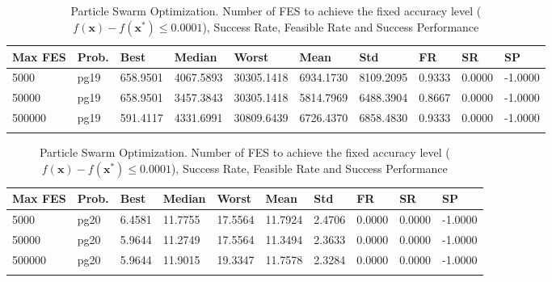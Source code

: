 \documentclass[10pt, a4paper]{book}
\begin{document}
\begin{center}
\begin{longtable}{l l l l l l l l l l}
\textbf{Max FES} & \textbf{Prob.} & \textbf{Best} & \textbf{Median} & \textbf{Worst} & \textbf{Mean} & \textbf{Std} & \textbf{FR} & \textbf{SR} & \textbf{SP} \\
\hline
5000 & pg19 & 658.9501 & 4067.5893 & 30305.1418 & 6934.1730 & 8109.2095 & 0.9333 & 0.0000 & -1.0000 \\
50000 & pg19 & 658.9501 & 3457.3843 & 30305.1418 & 5814.7969 & 6488.3904 & 0.8667 & 0.0000 & -1.0000 \\
500000 & pg19 & 591.4117 & 4331.6991 & 30809.6439 & 6726.4370 & 6858.4830 & 0.9333 & 0.0000 & -1.0000 \\

\caption{ Particle Swarm Optimization. Number of FES to achieve the fixed accuracy level ($f(\mathbf{x}) - f(\mathbf{x}^{*}) \leq 0.0001$), Success Rate, Feasible Rate and Success Performance }
\end{longtable}
\end{center}

\begin{center}
\begin{longtable}{l l l l l l l l l l}
\textbf{Max FES} & \textbf{Prob.} & \textbf{Best} & \textbf{Median} & \textbf{Worst} & \textbf{Mean} & \textbf{Std} & \textbf{FR} & \textbf{SR} & \textbf{SP} \\
\hline
5000 & pg20 & 6.4581 & 11.7755 & 17.5564 & 11.7924 & 2.4706 & 0.0000 & 0.0000 & -1.0000 \\
50000 & pg20 & 5.9644 & 11.2749 & 17.5564 & 11.3494 & 2.3633 & 0.0000 & 0.0000 & -1.0000 \\
500000 & pg20 & 5.9644 & 11.9015 & 19.3347 & 11.7578 & 2.3284 & 0.0000 & 0.0000 & -1.0000 \\

\caption{ Particle Swarm Optimization. Number of FES to achieve the fixed accuracy level ($f(\mathbf{x}) - f(\mathbf{x}^{*}) \leq 0.0001$), Success Rate, Feasible Rate and Success Performance }
\end{longtable}
\end{center}
\end{document}
